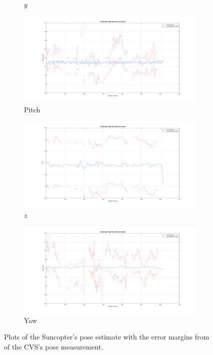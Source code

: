 \begin{figure}
\begin{subfigure}{0.45\textwidth}
    \caption{$y$}
  \end{subfigure}
  \begin{subfigure}{0.45\textwidth}
    \includegraphics[clip, trim = 150 0 120 0, width=\textwidth]{figures/chapter5/pitch}
    \caption{Pitch}
  \end{subfigure}
  \begin{subfigure}{0.45\textwidth}
    \includegraphics[clip, trim = 150 0 120 0, width=\textwidth]{figures/chapter5/z}
    \caption{$z$}
  \end{subfigure}
  \begin{subfigure}{0.45\textwidth}
    \includegraphics[clip, trim = 150 0 120 0, width=\textwidth]{figures/chapter5/yaw}
    \caption{Yaw}
  \end{subfigure}
  \caption[Plots of the Suncopter's flight and measurement errors.]{Plots of the Suncopter's pose estimate with the error margins from of the CVS's pose measurement. }
  \label{fig:chap5-results}
\end{figure}

